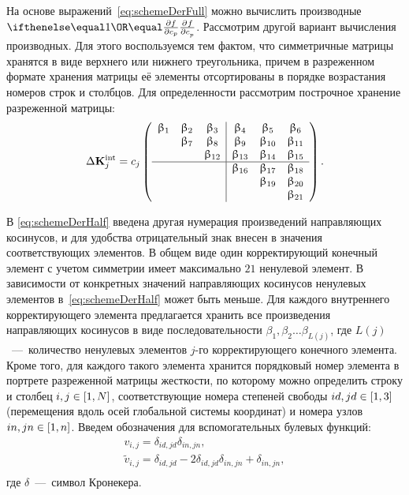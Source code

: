 На основе выражений~\eqref{eq:schemeDerFull} можно вычислить производные $ \partDer{f}{c_p}{} $. Рассмотрим другой вариант вычисления производных. Для этого воспользуемся тем фактом, что симметричные матрицы хранятся в виде верхнего или нижнего треугольника, причем в разреженном формате хранения матрицы её элементы отсортированы в порядке возрастания номеров строк и столбцов. Для определенности рассмотрим построчное хранение разреженной матрицы:
\begin{equation}
	\Delta \mathbf{K} ^ {\text{int}}_j = c_j 
	\left(
	\begin{array}{c c c | c c c}
		\upbeta_1 & \upbeta_2 & \upbeta_3 & \upbeta_4 & \upbeta_5 & \upbeta_6 \\
		& \upbeta_7 & \upbeta_8 & \upbeta_9 & \upbeta_{10} & \upbeta_{11} \\
		& & \upbeta_{12} & \upbeta_{13} & \upbeta_{14} & \upbeta_{15} \\
		\hline
		& & & \upbeta_{16} & \upbeta_{17} & \upbeta_{18} \\
		& & & & \upbeta_{19} & \upbeta_{20}  \\
		& & & & & \upbeta_{21}
	\end{array}
	\right).
	\label{eq:schemeDerHalf}
\end{equation}

В \eqref{eq:schemeDerHalf} введена другая нумерация произведений направляющих косинусов, и для удобства отрицательный знак внесен в значения соответствующих элементов. В общем виде один корректирующий конечный элемент с учетом симметрии имеет максимально $ 21 $ ненулевой элемент. В зависимости от конкретных значений направляющих косинусов ненулевых элементов в~\eqref{eq:schemeDerHalf} может быть меньше. Для каждого внутреннего корректирующего элемента предлагается хранить все произведения направляющих косинусов в виде последовательности $ \beta_1, \beta_2 \hdots \beta_{L(j)} $, где $ L(j) $~---~количество ненулевых элементов $ j $-го корректирующего конечного элемента. Кроме того, для каждого такого элемента хранится порядковый номер элемента в портрете разреженной матрицы жесткости, по которому можно определить строку и столбец $ i, j \in \left[ 1, N \right] $, соответствующие номера степеней свободы $ id, jd \in \left[ 1, 3 \right] $ (перемещения вдоль осей глобальной системы координат) и номера узлов $ in, jn \in \left[ 1, n \right] $. Введем обозначения для вспомогательных булевых функций:
\begin{equation}
	\begin{gathered}
		v_{i, j} = \delta_{id, jd} \delta_{in, jn}, \\
		\tilde{v}_{i, j} = \delta_{id, jd} - 2 \delta_{id, jd} \delta_{in, jn} + \delta_{in, jn}, \\
	\end{gathered}
\end{equation}
где $ \delta $~---~символ Кронекера.

